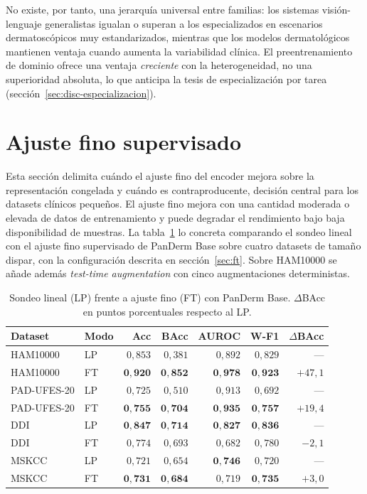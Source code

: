 No existe, por tanto, una jerarquía universal entre familias: los
sistemas visión-lenguaje generalistas igualan o superan a los
especializados en escenarios dermatoscópicos muy estandarizados,
mientras que los modelos dermatológicos mantienen ventaja cuando aumenta
la variabilidad clínica. El preentrenamiento de dominio ofrece una
ventaja \emph{creciente} con la heterogeneidad, no una superioridad
absoluta, lo que anticipa la tesis de especialización por tarea
(sección~\ref{sec:disc-especializacion}).

\section{Ajuste fino supervisado}
\label{sec:ft-results}

Esta sección delimita cuándo el ajuste fino del encoder mejora sobre
la representación congelada y cuándo es contraproducente, decisión
central para los datasets clínicos pequeños. El ajuste fino mejora con
una cantidad moderada o elevada de datos de entrenamiento y puede
degradar el rendimiento bajo baja disponibilidad de muestras. La
tabla~\ref{tab:ft-panderm} lo concreta comparando el
sondeo lineal con el ajuste fino supervisado de PanDerm Base sobre
cuatro datasets de tamaño dispar, con la configuración descrita
en sección~\ref{sec:ft}. Sobre HAM10000 se añade además
\emph{test-time augmentation} con cinco augmentaciones
deterministas.

\begin{table}[htbp]
\centering
\footnotesize
\setlength{\tabcolsep}{4pt}
\renewcommand{\arraystretch}{0.95}
\caption{Sondeo lineal (LP) frente a ajuste fino (FT) con PanDerm
Base. $\Delta$BAcc en puntos porcentuales respecto al LP.}
\label{tab:ft-panderm}
\begin{tabular}{llrrrrr}
\hline
Dataset      & Modo & Acc           & BAcc          & AUROC         & W-F1          & $\Delta$BAcc \\
\hline
HAM10000     & LP   & $0{,}853$     & $0{,}381$     & $0{,}892$     & $0{,}829$     & --- \\
HAM10000     & FT   & $\mathbf{0{,}920}$ & $\mathbf{0{,}852}$ & $\mathbf{0{,}978}$ & $\mathbf{0{,}923}$ & $+47{,}1$ \\
PAD-UFES-20  & LP   & $0{,}725$     & $0{,}510$     & $0{,}913$     & $0{,}692$     & --- \\
PAD-UFES-20  & FT   & $\mathbf{0{,}755}$ & $\mathbf{0{,}704}$ & $\mathbf{0{,}935}$ & $\mathbf{0{,}757}$ & $+19{,}4$ \\
DDI          & LP   & $\mathbf{0{,}847}$ & $\mathbf{0{,}714}$ & $\mathbf{0{,}827}$ & $\mathbf{0{,}836}$ & --- \\
DDI          & FT   & $0{,}774$     & $0{,}693$     & $0{,}682$     & $0{,}780$     & $-2{,}1$ \\
MSKCC        & LP   & $0{,}721$     & $0{,}654$     & $\mathbf{0{,}746}$ & $0{,}720$     & --- \\
MSKCC        & FT   & $\mathbf{0{,}731}$ & $\mathbf{0{,}684}$ & $0{,}719$     & $\mathbf{0{,}735}$ & $+3{,}0$ \\
\hline
\end{tabular}
\end{table}

